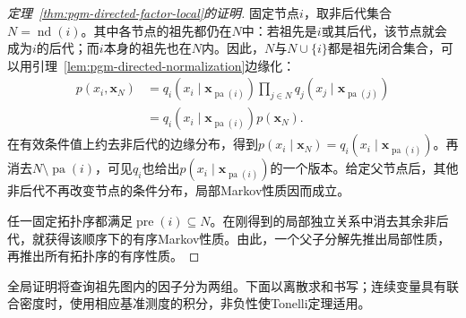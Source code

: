 \begin{proof}[定理~\ref{thm:pgm-directed-factor-local}的证明]
固定节点$i$，取非后代集合$N=\operatorname{nd}(i)$。其中各节点的祖先都仍在$N$中：若祖先是$i$或其后代，该节点就会成为$i$的后代；而$i$本身的祖先也在$N$内。因此，$N$与$N\cup\{i\}$都是祖先闭合集合，可以用引理~\ref{lem:pgm-directed-normalization}边缘化：
\[
  \begin{aligned}
    p(x_i,\bm{x}_N)
      &=q_i(x_i\mid\bm{x}_{\operatorname{pa}(i)})
        \prod_{j\in N}q_j(x_j\mid\bm{x}_{\operatorname{pa}(j)})\\
      &=q_i(x_i\mid\bm{x}_{\operatorname{pa}(i)})p(\bm{x}_N).
  \end{aligned}
\]
在有效条件值上约去非后代的边缘分布，得到$p(x_i\mid\bm{x}_N)=q_i(x_i\mid\bm{x}_{\operatorname{pa}(i)})$。再消去$N\setminus\operatorname{pa}(i)$，可见$q_i$也给出$p(x_i\mid\bm{x}_{\operatorname{pa}(i)})$的一个版本。给定父节点后，其他非后代不再改变节点的条件分布，局部Markov性质因而成立。

任一固定拓扑序都满足$\operatorname{pre}(i)\subseteq N$。在刚得到的局部独立关系中消去其余非后代，就获得该顺序下的有序Markov性质。由此，一个父子分解先推出局部性质，再推出所有拓扑序的有序性质。
\end{proof}

全局证明将查询祖先图内的因子分为两组。下面以离散求和书写；连续变量具有联合密度时，使用相应基准测度的积分，非负性使Tonelli定理适用。

